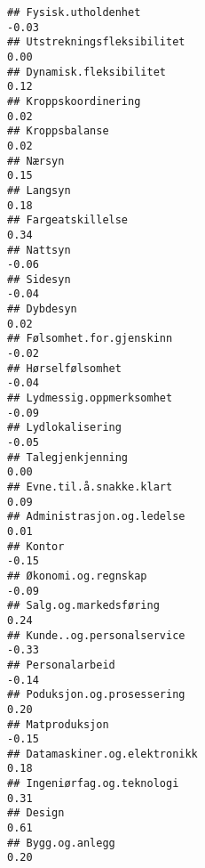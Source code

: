 \documentclass[
]{article}
\begin{document}
\begin{verbatim}
## Fysisk.utholdenhet                                                               -0.03
## Utstrekningsfleksibilitet                                                         0.00
## Dynamisk.fleksibilitet                                                            0.12
## Kroppskoordinering                                                                0.02
## Kroppsbalanse                                                                     0.02
## Nærsyn                                                                            0.15
## Langsyn                                                                           0.18
## Fargeatskillelse                                                                  0.34
## Nattsyn                                                                          -0.06
## Sidesyn                                                                          -0.04
## Dybdesyn                                                                          0.02
## Følsomhet.for.gjenskinn                                                          -0.02
## Hørselfølsomhet                                                                  -0.04
## Lydmessig.oppmerksomhet                                                          -0.09
## Lydlokalisering                                                                  -0.05
## Talegjenkjenning                                                                  0.00
## Evne.til.å.snakke.klart                                                           0.09
## Administrasjon.og.ledelse                                                         0.01
## Kontor                                                                           -0.15
## Økonomi.og.regnskap                                                              -0.09
## Salg.og.markedsføring                                                             0.24
## Kunde..og.personalservice                                                        -0.33
## Personalarbeid                                                                   -0.14
## Poduksjon.og.prosessering                                                         0.20
## Matproduksjon                                                                    -0.15
## Datamaskiner.og.elektronikk                                                       0.18
## Ingeniørfag.og.teknologi                                                          0.31
## Design                                                                            0.61
## Bygg.og.anlegg                                                                    0.20

\end{verbatim}
\end{document}
